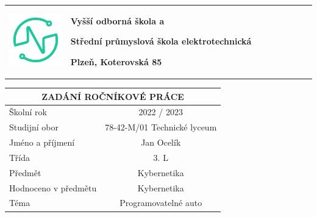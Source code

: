 \documentclass[12pt, a4paper]{article}
\begin{document}
	\newpage
	\thispagestyle{empty}
	\begin{center}
		\centering
		\begin{tabular}{m{0.2\linewidth}m{0.8\linewidth}}
			\includegraphics[width=1\linewidth]{SPSE_logo.png}
			&\centering
			\textbf{Vyšší odborná škola a}\par
			\textbf{Střední průmyslová škola elektrotechnická}\par
			\textbf{Plzeň, Koterovská 85}\par
		\end{tabular}
		\centering
		\vfill
		\def\arraystretch{1.8}
		\begin{tabular}{|l|c|}
			\hline
			\multicolumn{2}{|c|}{\textbf{\MakeUppercase{Zadání ročníkové práce}}} \\
			\hline
			Školní rok				&	2022 / 2023 \\
			\hline
			Studijní obor			&	78-42-M/01 Technické lyceum \\
			\hline
			Jméno a příjmení		&	Jan Ocelík \\
			\hline
			Třída					&	3. L \\
			\hline
			Předmět					&	Kybernetika \\
			\hline
			Hodnoceno v předmětu	&	Kybernetika \\
			\hline
			Téma					&	Programovatelné auto \\

\end{tabular}
\end{center}
\end{document}
